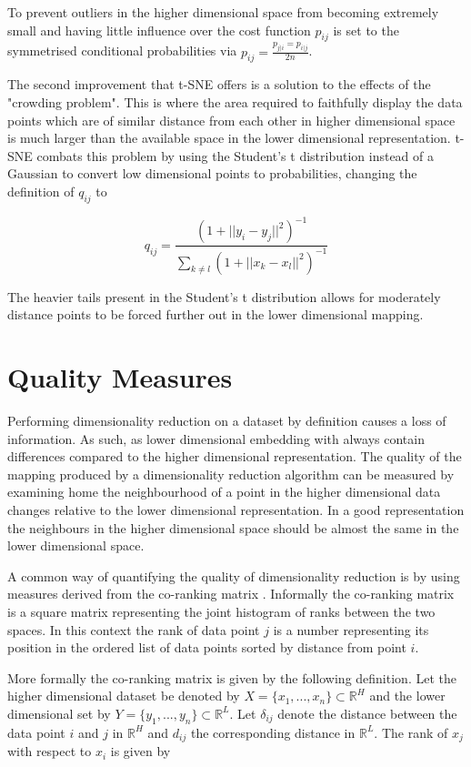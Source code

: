 To prevent outliers in the higher dimensional space from becoming extremely small and having little influence over the cost function $p_{ij}$ is set to the symmetrised conditional probabilities via $p_{ij} = \frac{p_{j|i} = p_{i|j}}{2n}$.

The second improvement that t-SNE offers is a solution to the effects of the "crowding problem". This is where the area required to faithfully display the data points which are of similar distance from each other in higher dimensional space is much larger than the available space in the lower dimensional representation. t-SNE combats this problem by using the Student's t distribution instead of a Gaussian to convert low dimensional points to probabilities, changing the definition of $q_{ij}$ to

\begin{equation}
	q_{ij} = \frac{(1 + ||y_i - y_j ||^2)^{-1}}{\sum_{k\neq l} (1 + ||x_k - x_l ||^2)^{-1}} 
\end{equation}

The heavier tails present in the Student's t distribution allows for moderately distance points to be forced further out in the lower dimensional mapping. 

\section{Quality Measures}
Performing dimensionality reduction on a dataset by definition causes a loss of information. As such, as lower dimensional embedding with always contain differences compared to the higher dimensional representation. The quality of the mapping produced by a dimensionality reduction algorithm can be measured by examining home the neighbourhood of a point in the higher dimensional data changes relative to the lower dimensional representation. In a good representation the neighbours in the higher dimensional space should be almost the same in the lower dimensional space. 

A common way of quantifying the quality of dimensionality reduction is by using measures derived from the co-ranking matrix \cite{lee2008rank}. Informally the co-ranking matrix is a square matrix representing the joint histogram of ranks between the two spaces. In this context the rank of data point $j$ is a number representing its position in the ordered list of data points sorted by distance from point $i$.

More formally the co-ranking matrix is given by the following definition. Let the higher dimensional dataset be denoted by $X = \{x_1, ..., x_n\} \subset \mathbb{R}^H$ and the lower dimensional set by $Y = \{y_1, ..., y_n\} \subset \mathbb{R}^L$. Let $\delta_{ij}$ denote the distance between the data point $i$ and $j$ in $\mathbb{R}^H$ and $d_{ij}$ the corresponding distance in $\mathbb{R}^L$. The rank of $x_j$ with respect to $x_i$ is given by

